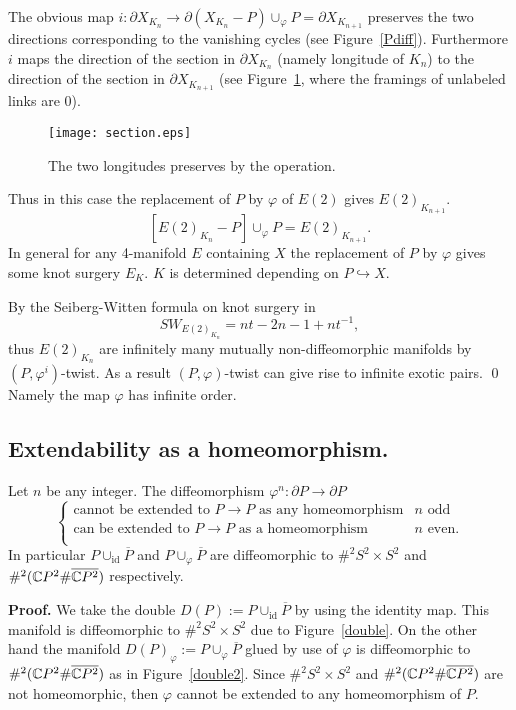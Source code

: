 \documentclass[11pt]{amsart}
\begin{document}
The obvious map $i:\partial X_{K_n}\to \partial(X_{K_n}-P)\cup_\varphi P=\partial X_{K_{n+1}}$ preserves
the two directions corresponding to the vanishing cycles (see Figure~\ref{Pdiff}).
Furthermore $i$ maps the direction of the section in $\partial X_{K_n}$  (namely longitude of $K_n$) to
the direction of the section in $\partial X_{K_{n+1}}$ (see Figure~\ref{section}, where 
the framings of unlabeled links are $0$).
\begin{figure}[htbp]
\begin{center}
\texttt{[image: section.eps]}
\caption{The two longitudes preserves by the operation.}
\label{section}
\end{center}
\end{figure}
Thus in this case the replacement of $P$ by $\varphi$ of $E(2)$ gives $E(2)_{K_{n+1}}$.
$$[E(2)_{K_{n}}-P]\cup_{\varphi}P=E(2)_{K_{n+1}}.$$
In general for any 4-manifold $E$ containing $X$ the replacement of $P$ by $\varphi$
gives some knot surgery $E_K$.
$K$ is determined depending on $P\hookrightarrow X$.

By the Seiberg-Witten formula on knot surgery in \cite{[FS]}
$$SW_{E(2)_{K_n}}=nt-2n-1+nt^{-1},$$
thus $E(2)_{K_n}$ are infinitely many mutually non-diffeomorphic manifolds by $(P,\varphi^i)$-twist.
As a result $(P,\varphi)$-twist can give rise to infinite exotic pairs.
\qed
\medskip\\
Namely the map $\varphi$ has infinite order.
\subsection{Extendability as a homeomorphism.}
\begin{prop}
\label{extend}
Let $n$ be any integer.
The diffeomorphism $\varphi^n:\partial P\to \partial P$
$$\left\{
\begin{array}{ll}
\text{cannot be extended to $P\to P$ as any homeomorphism}&n\text{ odd}\\
\text{can be extended to $P\to P$ as a homeomorphism}&n\text{ even.}\\
\end{array}
\right.$$
In particular $P\cup_{\text{id}}\overline{P}$ and $P\cup_{\varphi}\overline{P}$ are
diffeomorphic to $\#^2S^2\times S^2$ and $\#^2({\Bbb C}P^2\#\overline{{\Bbb C}P^2})$ respectively.
\end{prop}
{{\bf Proof. }}
We take the double $D(P):=P\cup_{\text{id}} \overline{P}$ by using the identity map.
This manifold is diffeomorphic to $\#^2S^2\times S^2$ due to Figure~\ref{double}.
On the other hand the manifold $D(P)_\varphi:=P\cup_{\varphi}\overline{P}$ glued by use of $\varphi$
is diffeomorphic to $\#^2({\Bbb C}P^2\#\overline{{\Bbb C}P^2})$ as in Figure~\ref{double2}.
Since $\#^2S^2\times S^2$ and $\#^2({\Bbb C}P^2\#\overline{{\Bbb C}P^2})$ are not homeomorphic,
then $\varphi$ cannot be extended to any homeomorphism of $P$.
\end{document}
